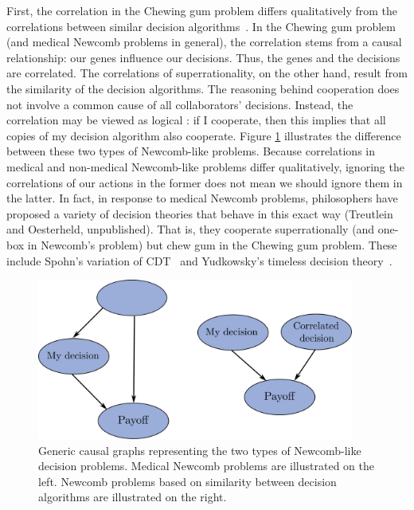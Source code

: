 First, the correlation in the Chewing gum problem differs qualitatively
from the correlations between similar decision algorithms~\parencite{OesterheldTreutlein201X}.
In the Chewing gum problem (and
medical Newcomb problems in general), the correlation stems from a
causal relationship: our genes influence our decisions. Thus, the genes
and the decisions are correlated. The correlations of superrationality,
on the other hand, result from the similarity of the decision
algorithms. The reasoning behind cooperation does not involve a common
cause of all collaborators' decisions. Instead, the correlation may be
viewed as logical \parencite{Garrabrant2016-km}: if I
cooperate, then this implies that all copies of my decision algorithm
also cooperate. Figure \ref{two-types} illustrates the difference between
these two types of Newcomb-like problems. Because correlations in
medical and non-medical Newcomb-like problems differ qualitatively,
ignoring the correlations of our actions in the former does not mean we
should ignore them in the latter. In fact, in response to medical
Newcomb problems, philosophers have proposed a variety of decision
theories that behave in this exact way (Treutlein and Oesterheld,
unpublished). That is, they cooperate superrationally (and one-box in
Newcomb's problem) but chew gum in the Chewing gum problem. These
include Spohn's variation of CDT~\citeyear{Spohn2003-zf,Spohn2005-tm,Spohn2012-fo} and Yudkowsky's
timeless decision theory~\citeyear{Yudkowsky2010-ul}.

\begin{figure}[h!]
    \centering
    \includegraphics[width=4.1in]{figs/two-types}
    \caption{Generic causal graphs representing the two types of Newcomb-like decision problems. Medical Newcomb problems are illustrated on the left. Newcomb problems based on similarity between decision algorithms are illustrated on the right.}
    \label{two-types}
\end{figure}

